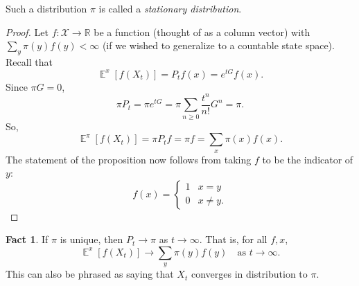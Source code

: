 \documentclass{article}
\theoremstyle{definition}
\newtheorem{fact}{Fact}
\DeclareMathOperator{\e}{\mathbb{E}}
\newcommand{\R}{\mathbb{R}}
\begin{document}
Such a distribution $\pi$ is called a \emph{stationary distribution}.


\begin{proof}
Let $f:\mathcal{X}\to \R$ be a function (thought of as a column vector) with $\sum_y \pi(y)f(y) < \infty$ (if we wished to generalize to a countable state space). Recall that
\[
	\e^x[f(X_t)] = P_t f(x) = e^{tG}f(x).
\]
Since $\pi G = 0$, 
\[
	\pi P_t = \pi e^{tG} = \pi \sum_{n\geq 0} \frac{t^n}{n!} G^n = \pi.
\]
So,
\[
	\e^\pi[f(X_t)] = \pi P_t f = \pi f = \sum_{x} \pi(x) f(x).
\]
The statement of the proposition now follows from taking $f$ to be the indicator of $y$:
\[
	f(x) = \begin{cases}
		1 & x=y\\
		0 & x\neq y.
	\end{cases}
\]
\end{proof}

\begin{fact}
	If $\pi$ is unique, then $P_t \to \pi$ as $t\to \infty$. That is, for all $f, x$, 
	\[
		\e^x[f(X_t)]\to \sum_y \pi(y) f(y) \quad \text{as }t\to \infty.
	\]
	This can also be phrased as saying that $X_t$ converges in distribution to $\pi$. 
\end{fact}
\end{document}
